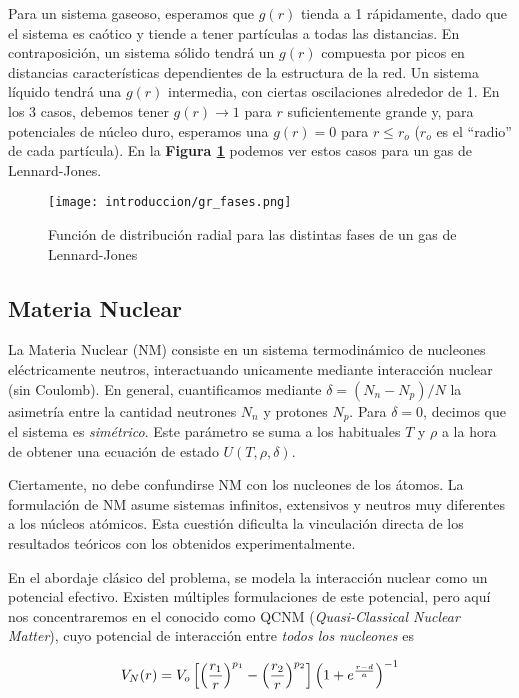Para un sistema gaseoso, esperamos que $g(r)$ tienda a 1 rápidamente, dado que el sistema es caótico y tiende a tener partículas a todas las distancias.
En contraposición, un sistema sólido tendrá un $g(r)$ compuesta por picos en distancias características dependientes de la estructura de la red.
Un sistema líquido tendrá una $g(r)$ intermedia, con ciertas oscilaciones alrededor de 1.
En los 3 casos, debemos tener $g(r)\to 1$ para $r$ suficientemente grande y, para potenciales de núcleo duro, esperamos una $g(r)=0$ para $r\leq r_o$ ($r_o$ es el ``radio'' de cada partícula).
En la \textbf{Figura \ref{fig:gr_fases}} podemos ver estos casos para un gas de Lennard-Jones.

\begin{figure}[H]
	\centering	%
	\texttt{[image: introduccion/gr\_fases.png]}
	\caption{Función de distribución radial para las distintas fases de un gas de Lennard-Jones}
	\label{fig:gr_fases}
\end{figure}

\subsection{Materia Nuclear}{\label{sec:intro_NM}}

La Materia Nuclear (NM) consiste en un sistema termodinámico de nucleones eléctricamente neutros, interactuando unicamente mediante interacción nuclear (sin Coulomb)\cite{Molinelli}.
En general, cuantificamos mediante $\delta=(N_n - N_p)/N$ la asimetría entre la cantidad neutrones $N_n$ y protones $N_p$.
Para $\delta=0$, decimos que el sistema es \textit{simétrico}.
Este parámetro se suma a los habituales $T$ y $\rho$ a la hora de obtener una ecuación de estado $U(T,\rho, \delta)$.

Ciertamente, no debe confundirse NM con los nucleones de los átomos.
La formulación de NM asume sistemas infinitos, extensivos y neutros muy diferentes a los núcleos atómicos.
Esta cuestión dificulta la vinculación directa de los resultados teóricos con los obtenidos experimentalmente.

En el abordaje clásico del problema, se modela la interacción nuclear como un potencial efectivo.
Existen múltiples formulaciones de este potencial, pero aquí nos concentraremos en el conocido como QCNM\cite{Dorso1988} (\textit{Quasi-Classical Nuclear Matter}), cuyo potencial de interacción entre \textit{todos los nucleones} es

\begin{equation}{\label{eq:pot_QCNM}}
 V_N(r) = V_o \left[ \left(\frac{r_1}{r}\right)^{p_1} - \left(\frac{r_2}{r}\right)^{p_2} \right] \left( 1 + e^{\frac{r-d}{a}} \right)^{-1}
\end{equation}

